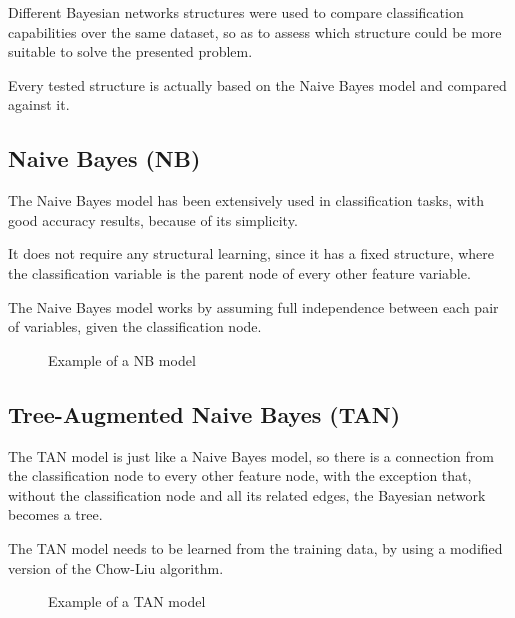 \documentclass[twoside,twocolumn]{article}
\begin{document}
Different Bayesian networks structures were used to compare classification capabilities over the same dataset, so as to assess which structure could be more suitable to solve the presented problem.

Every tested structure is actually based on the Naive Bayes model and compared against it.

\subsection{Naive Bayes (NB)}

The Naive Bayes model has been extensively used in classification tasks, with good accuracy results, because of its simplicity. 

It does not require any structural learning, since it has a fixed structure, where the classification variable is the parent node of every other feature variable.

The Naive Bayes model works by assuming full independence between each pair of variables, given the classification node.

\begin{figure}[h]
  \caption{Example of a NB model}
  \centering
\end{figure}

\subsection{Tree-Augmented Naive Bayes (TAN)}

The TAN model is just like a Naive Bayes model, so there is a connection from the classification node to every other feature node, 
with the exception that, without the classification node and all its related edges, the Bayesian network becomes a tree.

The TAN model needs to be learned from the training data, by using a modified version of the Chow-Liu algorithm.

\begin{figure}[h]
  \caption{Example of a TAN model}
  \centering
\end{figure}
\end{document}
